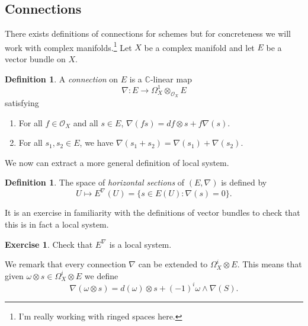 \documentclass[12pt]{book}
\numberwithin{equation}{section}
\theoremstyle{definition}
\newtheorem{definition}[theorem]{Definition}
\newtheorem{exercise}[theorem]{Exercise}
\theoremstyle{remark}
\newcommand{\CC}{\mathbb{C}}
\newcommand{\Ocal}{\mathcal{O}}
\begin{document}
\subsection{Connections}
There exists definitions of connections for schemes but for concreteness we will work with complex manifolds.\footnote{I'm really working with ringed spaces here.}
Let $X$ be a complex manifold and let $E$ be a vector bundle on $X$. 
\begin{definition}
	A \emph{connection} on $E$ is a $\CC$-linear map 
	$$ \nabla: E \to \Omega_X^1 \otimes_{\Ocal_X} E $$
	satisfying 
	\begin{enumerate}
		\item For all $f \in \Ocal_X$ and all $s\in E$, $\nabla(fs) = df\otimes s + f\nabla(s).$ 
		\item For all $s_1,s_2 \in E$, we have $\nabla(s_1+s_2)=\nabla(s_1) + \nabla(s_2)$.
	\end{enumerate}
\end{definition}
We now can extract a more general definition of local system.
\begin{definition}
	The space of \emph{horizontal sections} of $(E,\nabla)$ is defined by 
	$$ U \mapsto E^{\nabla}(U) = \lbrace s \in E(U) \colon \nabla(s) =0 \rbrace.$$
\end{definition}
It is an exercise in familiarity with the definitions of vector bundles to check that this is in fact a local system. 
\begin{exercise}
	Check that $E^{\nabla}$ is a local system.
\end{exercise}
We remark that every connection $\nabla$ can be extended to $\Omega^i_X \otimes E$.
This means that given $\omega \otimes s \in \Omega^i_X \otimes E$ we define
$$ \nabla(\omega \otimes s) = d(\omega) \otimes s + (-1)^i \omega \wedge \nabla(S).$$
\end{document}
